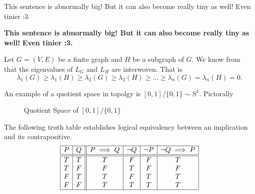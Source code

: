 \documentclass{article}
\begin{document}
{\Large This sentence is abnormally big! But it can also}
{\small become really tiny as well!}
{\scriptsize Even tinier :3.}

\textbf{\color{red}\Large This sentence is abnormally big! But it can also}
\textbf{\color{blue}\small become really tiny as well!}
\textbf{\color{green}\scriptsize Even tinier :3.}

\vspace{2cm}

Let $G = (V,E)$ be a finite graph and $H$ be a subgraph of $G$. We know from \cite{DAS2004715} that the eigenvalues of $L_G$ and $L_H$ are interwoven. That is
\[
    \lambda_1(G) \geq \lambda_1(H) \geq \lambda_2(G) \geq \lambda_2(H) \geq \ldots \geq \lambda_n(G) = \lambda_n(H) = 0
.\]

\vspace{2cm}
\noindent
An example of a quotient space in topolgy is $[0,1] / \{0,1\} \sim S^1$. Pictorally
\begin{figure}[h!]
    \centering
    \caption{Quotient Space of $[0,1] / \{0,1\}$}
\end{figure}

\vspace{2cm}

\noindent
The following truth table establishes logical equivalency between an implication and its contrapositive.
\[
    \begin{array}{|c|c||c|c|c|c|}
        \hline
        P & Q & P \implies Q & \lnot Q & \lnot P & \lnot Q \implies P \\
        \hline \hline
        T & T & T & F & F & T \\
        T & F & F & T & F & F \\
        F & T & T & F & T & T \\
        F & F & T & T & T & T \\\hline
    \end{array}
\]

\newpage


\end{document}
